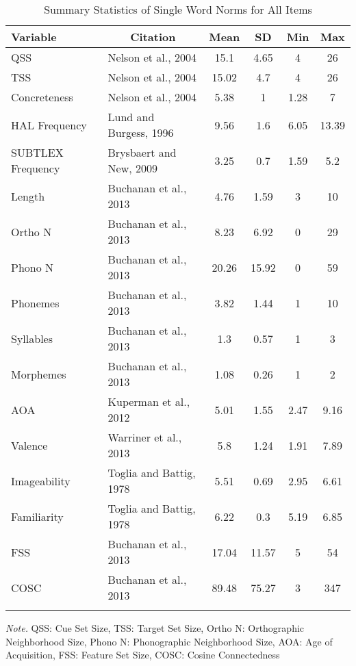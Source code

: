 \documentclass[english,man]{apa6}
\theoremstyle{definition}
\theoremstyle{definition}
\theoremstyle{remark}
\begin{document}
\begin{table}[tbp]
\begin{center}
\begin{threeparttable}
\caption{\label{tab:unnamed-chunk-4}Summary Statistics of Single Word Norms for All Items}
\begin{tabular}{llcccc}
\toprule
Variable & \multicolumn{1}{c}{Citation} & \multicolumn{1}{c}{Mean} & \multicolumn{1}{c}{SD} & \multicolumn{1}{c}{Min} & \multicolumn{1}{c}{Max}\\
\midrule
QSS & Nelson et al., 2004 & 15.1 & 4.65 & 4 & 26\\
TSS & Nelson et al., 2004 & 15.02 & 4.7 & 4 & 26\\
Concreteness & Nelson et al., 2004 & 5.38 & 1 & 1.28 & 7\\
HAL Frequency & Lund and Burgess, 1996 & 9.56 & 1.6 & 6.05 & 13.39\\
SUBTLEX Frequency & Brysbaert and New, 2009 & 3.25 & 0.7 & 1.59 & 5.2\\
Length & Buchanan et al., 2013 & 4.76 & 1.59 & 3 & 10\\
Ortho N & Buchanan et al., 2013 & 8.23 & 6.92 & 0 & 29\\
Phono N & Buchanan et al., 2013 & 20.26 & 15.92 & 0 & 59\\
Phonemes & Buchanan et al., 2013 & 3.82 & 1.44 & 1 & 10\\
Syllables & Buchanan et al., 2013 & 1.3 & 0.57 & 1 & 3\\
Morphemes & Buchanan et al., 2013 & 1.08 & 0.26 & 1 & 2\\
AOA & Kuperman et al., 2012 & 5.01 & 1.55 & 2.47 & 9.16\\
Valence & Warriner et al., 2013 & 5.8 & 1.24 & 1.91 & 7.89\\
Imageability & Toglia and Battig, 1978 & 5.51 & 0.69 & 2.95 & 6.61\\
Familiarity & Toglia and Battig, 1978 & 6.22 & 0.3 & 5.19 & 6.85\\
FSS & Buchanan et al., 2013 & 17.04 & 11.57 & 5 & 54\\
COSC & Buchanan et al., 2013 & 89.48 & 75.27 & 3 & 347\\
\bottomrule
\addlinespace
\end{tabular}
\begin{tablenotes}[para]
\textit{Note.} QSS: Cue Set Size, TSS: Target Set Size, Ortho N: Orthographic Neighborhood Size, Phono N: Phonographic Neighborhood Size, AOA: Age of Acquisition, FSS: Feature Set Size, COSC: Cosine Connectedness
\end{tablenotes}
\end{threeparttable}
\end{center}
\end{table}
\end{document}
